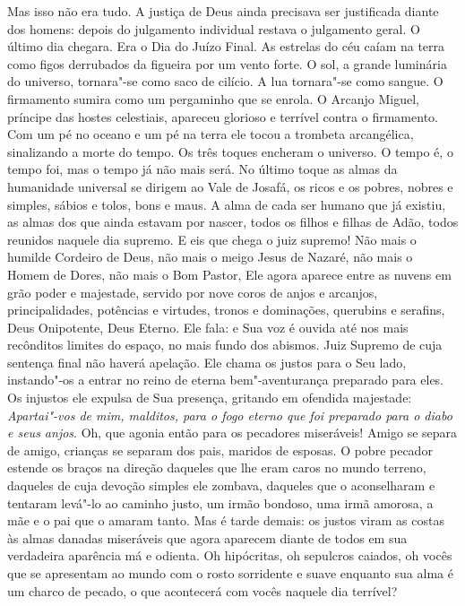 Mas isso não era tudo. A justiça de Deus ainda precisava ser justificada
diante dos homens: depois do julgamento individual restava o julgamento
geral. O último dia chegara. Era o Dia do Juízo Final. As estrelas do
céu caíam na terra como figos derrubados da figueira por um vento
forte. O sol, a grande luminária do universo, tornara"-se como saco de
cilício. A lua tornara"-se como sangue. O firmamento sumira como um
pergaminho que se enrola. O Arcanjo Miguel, príncipe das hostes
celestiais, apareceu glorioso e terrível contra o firmamento. Com um pé
no oceano e um pé na terra ele tocou a trombeta arcangélica,
sinalizando a morte do tempo. Os três toques encheram o universo. O
tempo é, o tempo foi, mas o tempo já não mais será. No último toque as
almas da humanidade universal se dirigem ao Vale de Josafá, os ricos e
os pobres, nobres e simples, sábios e tolos, bons e maus. A alma de
cada ser humano que já existiu, as almas dos que ainda estavam por
nascer, todos os filhos e filhas de Adão, todos reunidos naquele dia
supremo. E eis que chega o juiz supremo! Não mais o humilde Cordeiro de
Deus, não mais o meigo Jesus de Nazaré, não mais o Homem de Dores, não
mais o Bom Pastor, Ele agora aparece entre as nuvens em grão poder e
majestade, servido por nove coros de anjos e arcanjos, principalidades,
potências e virtudes, tronos e dominações, querubins e serafins, Deus
Onipotente, Deus Eterno. Ele fala: e Sua voz é ouvida até nos mais
recônditos limites do espaço, no mais fundo dos abismos. Juiz Supremo
de cuja sentença final não haverá apelação. Ele chama os justos para o
Seu lado, instando"-os a entrar no reino de eterna bem"-aventurança
preparado para eles. Os injustos ele expulsa de Sua presença, gritando
em ofendida majestade: \textit{Apartai"-vos de mim, malditos, para o fogo
eterno que foi preparado para o diabo e seus anjos}. Oh, que agonia
então para os pecadores miseráveis! Amigo se separa de amigo, crianças
se separam dos pais, maridos de esposas. O pobre pecador estende os
braços na direção daqueles que lhe eram caros no mundo terreno,
daqueles de cuja devoção simples ele zombava, daqueles que o
aconselharam e tentaram levá"-lo ao caminho justo, um irmão bondoso, uma
irmã amorosa, a mãe e o pai que o amaram tanto. Mas é tarde demais: os
justos viram as costas às almas danadas miseráveis que agora aparecem
diante de todos em sua verdadeira aparência má e odienta. Oh hipócritas,
oh sepulcros caiados, oh vocês que se apresentam ao mundo com o rosto
sorridente e suave enquanto sua alma é um charco de pecado, o que
acontecerá com vocês naquele dia terrível?

